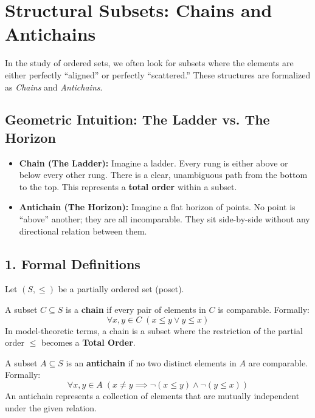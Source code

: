 
\section{Structural Subsets: Chains and Antichains}

In the study of ordered sets, we often look for subsets where the elements are either perfectly ``aligned'' or perfectly ``scattered.'' These structures are formalized as \emph{Chains} and \emph{Antichains}.

\subsection*{Geometric Intuition: The Ladder vs. The Horizon}

\begin{itemize}
    \item \textbf{Chain (The Ladder):} Imagine a ladder. Every rung is either above or below every other rung. There is a clear, unambiguous path from the bottom to the top. This represents a \textbf{total order} within a subset.
    \item \textbf{Antichain (The Horizon):} Imagine a flat horizon of points. No point is ``above'' another; they are all incomparable. They sit side-by-side without any directional relation between them.
\end{itemize}

\subsection*{1. Formal Definitions}

Let $(S, \le)$ be a partially ordered set (poset).

\begin{definition}[Chain]
A subset $C \subseteq S$ is a \textbf{chain} if every pair of elements in $C$ is comparable. Formally:
\[
\forall x, y \in C \; (x \le y \lor y \le x)
\]
In model-theoretic terms, a chain is a subset where the restriction of the partial order $\le$ becomes a \textbf{Total Order}.
\end{definition}

\begin{definition}[Antichain]
A subset $A \subseteq S$ is an \textbf{antichain} if no two distinct elements in $A$ are comparable. Formally:
\[
\forall x, y \in A \; (x \neq y \implies \neg(x \le y) \land \neg(y \le x))
\]
An antichain represents a collection of elements that are mutually independent under the given relation.
\end{definition}

